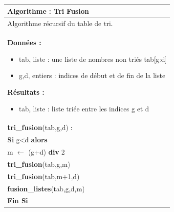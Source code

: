\documentclass[10pt]{article}
\begin{document}
\begin{pseudo}
\begin{center}
\begin{tabular}{p{}}
\hline
\textbf{Algorithme :} Tri Fusion \\
\hline
Algorithme récursif du table de tri. \\
\textbf{Données :}
\begin{itemize}
\item \textsf{tab}, liste : une liste de nombres non triés \textsf{tab[g:d]} 
\item \textsf{g,d}, entiers : indices de début et de fin de la liste
\end{itemize}
\textbf{Résultats :} 
\begin{itemize}
\item \textsf{tab}, liste : liste triée entre les indices \textsf{g} et \textsf{d}
\end{itemize}
\\
\textbf{tri\_fusion}(\textsf{tab,g,d}) :\\
\hspace{.4cm} \textbf{Si} \textsf{g<d}  \textbf{alors} \\
\hspace{.8cm} \textsf{m $\leftarrow$ (g+d)} \textbf{div} 2\\
\hspace{.8cm} \textbf{tri\_fusion}(tab,g,m) \\
\hspace{.8cm} \textbf{tri\_fusion}(tab,m+1,d) \\
\hspace{.8cm} \textbf{fusion\_listes}(tab,g,d,m) \\
\hspace{.4cm}  \textbf{Fin Si}\\
\hline
\end{tabular}
\end{center}
\end{pseudo}
\end{document}
